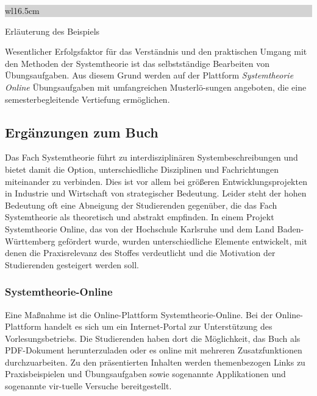 \noindent
\colorbox{lightgray}{%
%
\renewcommand\arraystretch{0.6}%
\begin{tabular}{ wl{16.5cm} }
{\selectfont
{}}
\end{tabular}%
}\medskip

\noindent Erläuterung des Beispiels \medskip

\noindent Wesentlicher Erfolgsfaktor für das Verständnis und den praktischen Umgang mit den Methoden der Systemtheorie ist das selbstständige Bearbeiten von Übungsaufgaben. Aus diesem Grund werden auf der Plattform \textit{Systemtheorie Online} Übungsaufgaben mit umfangreichen Musterlö-sungen angeboten, die eine semesterbegleitende Vertiefung ermöglichen. 

\newpage


\subsection{Ergänzungen zum Buch}

Das Fach Systemtheorie führt zu interdisziplinären Systembeschreibungen und bietet damit die Option, unterschiedliche Disziplinen und Fachrichtungen miteinander zu verbinden. Dies ist vor allem bei größeren Entwicklungsprojekten in Industrie und Wirtschaft von strategischer Bedeutung. Leider steht der hohen Bedeutung oft eine Abneigung der Studierenden gegenüber, die das Fach Systemtheorie als theoretisch und abstrakt empfinden. In einem Projekt Systemtheorie Online, das von der Hochschule Karlsruhe und dem Land Baden-Württemberg gefördert wurde, wurden unterschiedliche Elemente entwickelt, mit denen die Praxisrelevanz des Stoffes verdeutlicht und die Motivation der Studierenden gesteigert werden soll. 

\subsubsection{Systemtheorie-Online}

Eine Maßnahme ist die Online-Plattform Systemtheorie-Online. Bei der Online-Plattform handelt es sich um ein Internet-Portal zur Unterstützung des Vorlesungsbetriebs. Die Studierenden haben dort die Möglichkeit, das Buch als PDF-Dokument herunterzuladen oder es online mit mehreren Zusatzfunktionen durchzuarbeiten. Zu den präsentierten Inhalten werden themenbezogen Links zu Praxisbeispielen und Übungsaufgaben sowie sogenannte Applikationen und sogenannte vir-tuelle Versuche bereitgestellt.

